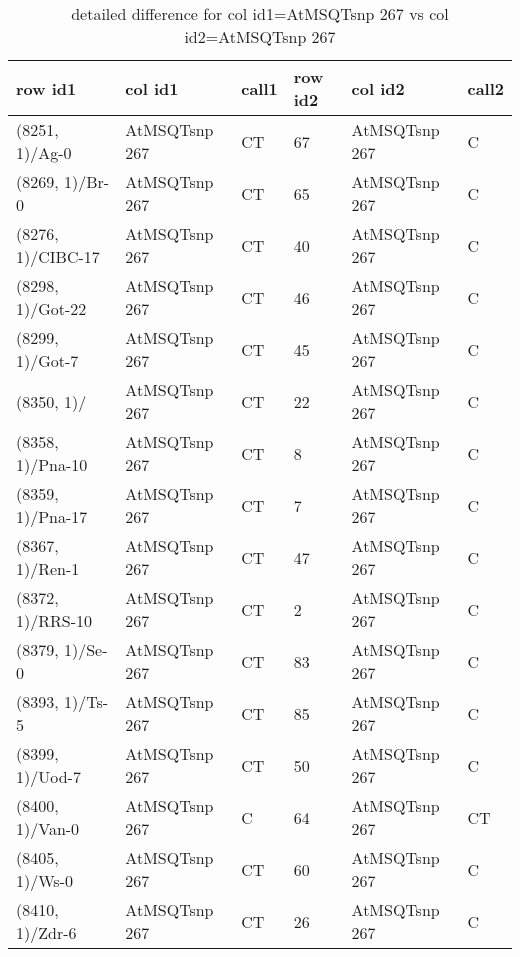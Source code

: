 \begin{center}
\begin{longtable}{|l|l|l|l|l|l|}
\caption{detailed difference for col id1=AtMSQTsnp 267 vs col id2=AtMSQTsnp 267} \label{table_dm611}\\
\hline
row id1&col id1&call1&row id2&col id2&call2\\
\hline
(8251, 1)/Ag-0&AtMSQTsnp 267&CT&67&AtMSQTsnp 267&C\\
(8269, 1)/Br-0&AtMSQTsnp 267&CT&65&AtMSQTsnp 267&C\\
(8276, 1)/CIBC-17&AtMSQTsnp 267&CT&40&AtMSQTsnp 267&C\\
(8298, 1)/Got-22&AtMSQTsnp 267&CT&46&AtMSQTsnp 267&C\\
(8299, 1)/Got-7&AtMSQTsnp 267&CT&45&AtMSQTsnp 267&C\\
(8350, 1)/&AtMSQTsnp 267&CT&22&AtMSQTsnp 267&C\\
(8358, 1)/Pna-10&AtMSQTsnp 267&CT&8&AtMSQTsnp 267&C\\
(8359, 1)/Pna-17&AtMSQTsnp 267&CT&7&AtMSQTsnp 267&C\\
(8367, 1)/Ren-1&AtMSQTsnp 267&CT&47&AtMSQTsnp 267&C\\
(8372, 1)/RRS-10&AtMSQTsnp 267&CT&2&AtMSQTsnp 267&C\\
(8379, 1)/Se-0&AtMSQTsnp 267&CT&83&AtMSQTsnp 267&C\\
(8393, 1)/Ts-5&AtMSQTsnp 267&CT&85&AtMSQTsnp 267&C\\
(8399, 1)/Uod-7&AtMSQTsnp 267&CT&50&AtMSQTsnp 267&C\\
(8400, 1)/Van-0&AtMSQTsnp 267&C&64&AtMSQTsnp 267&CT\\
(8405, 1)/Ws-0&AtMSQTsnp 267&CT&60&AtMSQTsnp 267&C\\
(8410, 1)/Zdr-6&AtMSQTsnp 267&CT&26&AtMSQTsnp 267&C\\
\hline
\end{longtable}
\end{center}

